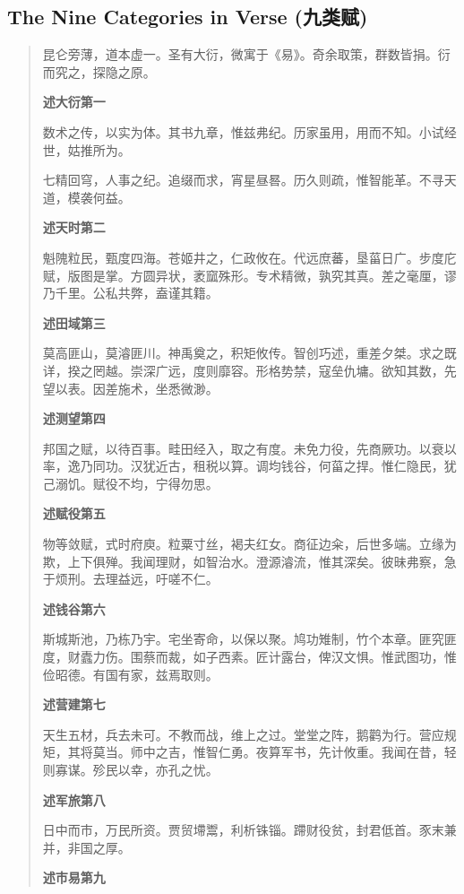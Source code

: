\documentclass[11pt,a4paper]{article}
\newenvironment{preface}{%
  \begin{quote}\color{prefacecolor}%
}{\end{quote}}
\newcommand{\zhtext}[1]{{\chinese #1}}
\begin{document}
\subsection{The Nine Categories in Verse (\zhtext{九类赋})}

\begin{preface}
昆仑旁薄，道本虚一。圣有大衍，微寓于《易》。奇余取策，群数皆捐。衍而究之，探隐之原。

\textbf{述大衍第一}

数术之传，以实为体。其书九章，惟兹弗纪。历家虽用，用而不知。小试经世，姑推所为。

七精回穹，人事之纪。追缀而求，宵星昼晷。历久则疏，惟智能革。不寻天道，模袭何益。

\textbf{述天时第二}

魁隗粒民，甄度四海。苍姬井之，仁政攸在。代远庶蕃，垦菑日广。步度庀赋，版图是掌。方圆异状，袤窳殊形。专术精微，孰究其真。差之毫厘，谬乃千里。公私共弊，盍谨其籍。

\textbf{述田域第三}

莫高匪山，莫濬匪川。神禹奠之，积矩攸传。智创巧述，重差夕桀。求之既详，揆之罔越。崇深广远，度则靡容。形格势禁，寇垒仇墉。欲知其数，先望以表。因差施术，坐悉微渺。

\textbf{述测望第四}

邦国之赋，以待百事。畦田经入，取之有度。未免力役，先商厥功。以衰以率，逸乃同功。汉犹近古，租税以算。调均钱谷，何菑之捍。惟仁隐民，犹己溺饥。赋役不均，宁得勿思。

\textbf{述赋役第五}

物等敛赋，式时府庾。粒粟寸丝，褐夫红女。商征边籴，后世多端。立缘为欺，上下俱殚。我闻理财，如智治水。澄源濬流，惟其深矣。彼昧弗察，急于烦刑。去理益远，吁嗟不仁。

\textbf{述钱谷第六}

斯城斯池，乃栋乃宇。宅坐寄命，以保以聚。鸠功雉制，竹个本章。匪究匪度，财蠹力伤。围蔡而裁，如子西素。匠计露台，俾汉文惧。惟武图功，惟俭昭德。有国有家，兹焉取则。

\textbf{述营建第七}

天生五材，兵去未可。不教而战，维上之过。堂堂之阵，鹅鹳为行。营应规矩，其将莫当。师中之吉，惟智仁勇。夜算军书，先计攸重。我闻在昔，轻则寡谋。殄民以幸，亦孔之忧。

\textbf{述军旅第八}

日中而市，万民所资。贾贸墆鬻，利析铢锱。蹛财役贫，封君低首。豕末兼并，非国之厚。

\textbf{述市易第九}
\end{preface}
\end{document}
